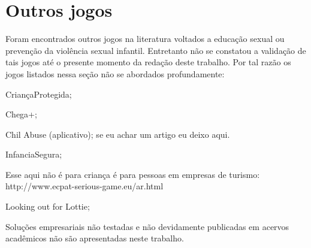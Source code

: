 

\cite{AnnaErgebnisse2012}


\cite{fingerleabschlussbericht}


\newpage

\section{Outros jogos}\label{sssec:outros}

Foram encontrados outros jogos na literatura voltados a educação sexual ou prevenção da violência sexual infantil. Entretanto não se constatou a validação de tais jogos até o presente momento da redação deste trabalho. Por tal razão os jogos listados nessa seção não se abordados profundamente: 

CriançaProtegida; %

Chega+; %

Chil Abuse (aplicativo); se eu achar um artigo eu deixo aqui.

InfanciaSegura; %


Esse aqui não é para criança é para pessoas em empresas de turismo: http://www.ecpat-serious-game.eu/ar.html


Looking out for Lottie; 




Soluções empresariais não testadas e não devidamente publicadas em acervos acadêmicos não são apresentadas neste trabalho.






